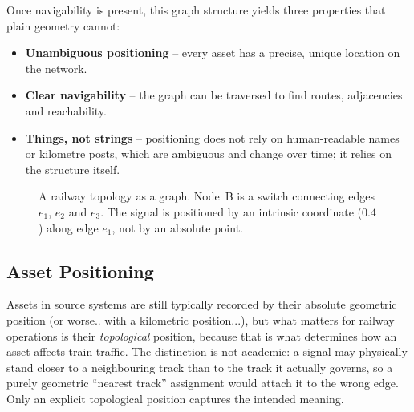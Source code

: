 \documentclass{ceurart}
\begin{document}
Once navigability is present, this graph structure yields three properties that
plain geometry cannot:

\begin{itemize}
  \item \textbf{Unambiguous positioning} -- every asset has a precise, unique
        location on the network.
  \item \textbf{Clear navigability} -- the graph can be traversed to find
        routes, adjacencies and reachability.
  \item \textbf{Things, not strings} -- positioning does not rely on
        human-readable names or kilometre posts, which are ambiguous and change
        over time; it relies on the structure itself.
\end{itemize}

\begin{figure}[t]
  \centering
  \caption{A railway topology as a graph. Node~B is a switch connecting edges
    $e_1$, $e_2$ and $e_3$. The signal is positioned by an intrinsic
    coordinate ($0.4$) along edge $e_1$, not by an absolute point.}
  \label{fig:topology}
\end{figure}

\subsection{Asset Positioning}

Assets in source systems are still typically recorded by their absolute
geometric position (or worse.. with a kilometric position...), but what matters 
for railway operations is their \emph{topological} position, because that is what 
determines how an asset affects train traffic. The distinction is not academic: 
a signal may physically stand closer to a neighbouring track than to the track it 
actually governs, so a purely geometric ``nearest track'' assignment would attach 
it to the wrong edge. Only an explicit topological position captures the intended 
meaning.
\end{document}

